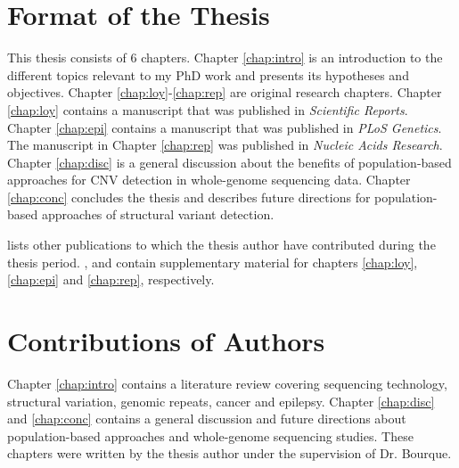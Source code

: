 \newpage

\section*{Format of the Thesis}

This thesis consists of 6 chapters. Chapter \ref{chap:intro} is an introduction to the different topics relevant to my PhD work and presents its hypotheses and objectives.
Chapter \ref{chap:loy}-\ref{chap:rep} are original research chapters.
Chapter \ref{chap:loy} contains a manuscript that was published in {\it Scientific Reports}\cite{Arseneault2017}.
Chapter \ref{chap:epi} contains a manuscript that was published in {\it PLoS Genetics}\cite{Monlong2018}.
The manuscript in Chapter \ref{chap:rep} was published in {\it Nucleic Acids Research}\cite{Monlong2018nar}.
Chapter \ref{chap:disc} is a general discussion about the benefits of population-based approaches for CNV detection in whole-genome sequencing data.
Chapter \ref{chap:conc} concludes the thesis and describes future directions for population-based approaches of structural variant detection.

 lists other publications to which the thesis author have contributed during the thesis period.
,  and  contain supplementary material for chapters \ref{chap:loy}, \ref{chap:epi} and \ref{chap:rep}, respectively.

\newpage

\section*{Contributions of Authors}
\label{sec:cont}

Chapter \ref{chap:intro} contains a literature review covering sequencing technology, structural variation, genomic repeats, cancer and epilepsy.
Chapter \ref{chap:disc} and \ref{chap:conc} contains a general discussion and future directions about population-based approaches and whole-genome sequencing studies.
These chapters were written by the thesis author under the supervision of Dr. Bourque.

